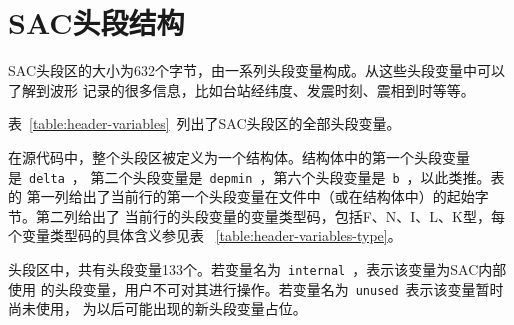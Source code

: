 \section{SAC头段结构}
SAC头段区的大小为632个字节，由一系列头段变量构成。从这些头段变量中可以了解到波形
记录的很多信息，比如台站经纬度、发震时刻、震相到时等等。

表~\ref{table:header-variables}~列出了SAC头段区的全部头段变量。

在源代码中，整个头段区被定义为一个结构体。结构体中的第一个头段变量是~\lstinline{delta}~，
第二个头段变量是~\lstinline{depmin}~，第六个头段变量是~\lstinline{b}~，以此类推。表的
第一列给出了当前行的第一个头段变量在文件中（或在结构体中）的起始字节。第二列给出了
当前行的头段变量的变量类型码，包括F、N、I、L、K型，每个变量类型码的具体含义参见表
~\ref{table:header-variables-type}。

头段区中，共有头段变量133个。若变量名为~\lstinline{internal}~，表示该变量为SAC内部使用
的头段变量，用户不可对其进行操作。若变量名为~\lstinline{unused}~表示该变量暂时尚未使用，
为以后可能出现的新头段变量占位。


